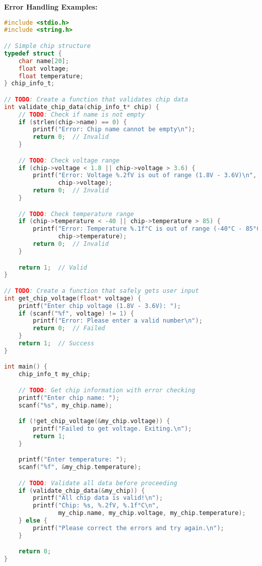 \documentclass[11pt,a4paper]{article}
\begin{document}
\textbf{Error Handling Examples:}
\begin{lstlisting}[language=C]
#include <stdio.h>
#include <string.h>

// Simple chip structure
typedef struct {
    char name[20];
    float voltage;
    float temperature;
} chip_info_t;

// TODO: Create a function that validates chip data
int validate_chip_data(chip_info_t* chip) {
    // TODO: Check if name is not empty
    if (strlen(chip->name) == 0) {
        printf("Error: Chip name cannot be empty\n");
        return 0;  // Invalid
    }

    // TODO: Check voltage range
    if (chip->voltage < 1.8 || chip->voltage > 3.6) {
        printf("Error: Voltage %.2fV is out of range (1.8V - 3.6V)\n",
               chip->voltage);
        return 0;  // Invalid
    }

    // TODO: Check temperature range
    if (chip->temperature < -40 || chip->temperature > 85) {
        printf("Error: Temperature %.1f°C is out of range (-40°C - 85°C)\n",
               chip->temperature);
        return 0;  // Invalid
    }

    return 1;  // Valid
}

// TODO: Create a function that safely gets user input
int get_chip_voltage(float* voltage) {
    printf("Enter chip voltage (1.8V - 3.6V): ");
    if (scanf("%f", voltage) != 1) {
        printf("Error: Please enter a valid number\n");
        return 0;  // Failed
    }
    return 1;  // Success
}

int main() {
    chip_info_t my_chip;

    // TODO: Get chip information with error checking
    printf("Enter chip name: ");
    scanf("%s", my_chip.name);

    if (!get_chip_voltage(&my_chip.voltage)) {
        printf("Failed to get voltage. Exiting.\n");
        return 1;
    }

    printf("Enter temperature: ");
    scanf("%f", &my_chip.temperature);

    // TODO: Validate all data before proceeding
    if (validate_chip_data(&my_chip)) {
        printf("All chip data is valid!\n");
        printf("Chip: %s, %.2fV, %.1f°C\n",
               my_chip.name, my_chip.voltage, my_chip.temperature);
    } else {
        printf("Please correct the errors and try again.\n");
    }

    return 0;
}
\end{lstlisting}
\end{document}
